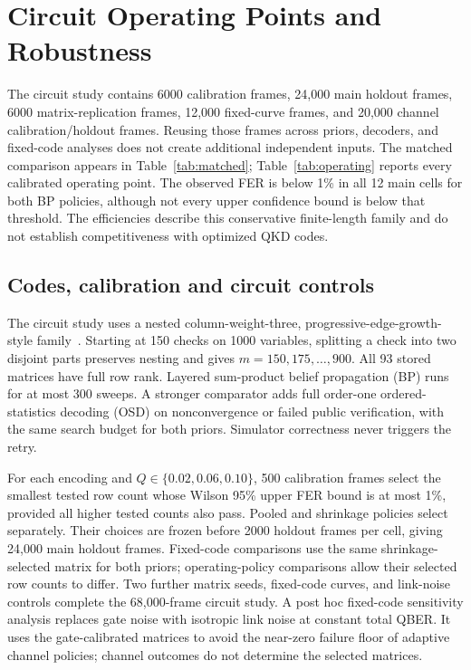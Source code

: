 \section{Circuit Operating Points and Robustness}
\label{app:circuit}
\label{app:ablation}
The circuit study contains 6000 calibration frames, 24,000 main holdout frames,
6000 matrix-replication frames, 12,000 fixed-curve frames, and 20,000 channel
calibration/holdout frames. Reusing those frames across priors, decoders, and fixed-code
analyses does not create additional independent inputs. The matched comparison appears in Table~\ref{tab:matched};
Table~\ref{tab:operating} reports every calibrated operating point. The observed FER is below 1\% in all
12 main cells for both BP policies, although not every upper confidence bound is
below that threshold. The efficiencies describe this conservative finite-length
family and do not establish competitiveness with optimized QKD codes.

\subsection{Codes, calibration and circuit controls}
The circuit study uses a nested column-weight-three, progressive-edge-growth-style
family~\cite{hu2005}. Starting at 150 checks on 1000 variables, splitting a check into
two disjoint parts preserves nesting and gives $m=150,175,\ldots,900$. All 93 stored
matrices have full row rank. Layered sum-product belief propagation (BP) runs for at most 300 sweeps.
A stronger comparator adds full order-one ordered-statistics decoding (OSD)
\cite{fossorier1995} on nonconvergence or failed public verification, with the same search
budget for both priors. Simulator correctness never triggers the retry.

For each encoding and $Q\in\{0.02,0.06,0.10\}$, 500 calibration frames select the
smallest tested row count whose Wilson 95\% upper FER bound is at most 1\%, provided
all higher tested counts also pass. Pooled and shrinkage policies select separately.
Their choices are frozen before 2000 holdout frames per cell, giving 24,000 main
holdout frames. Fixed-code comparisons use the same shrinkage-selected matrix for
both priors; operating-policy comparisons allow their selected row counts to differ.
Two further matrix seeds, fixed-code curves, and link-noise controls complete the
68,000-frame circuit study.
A post hoc fixed-code sensitivity analysis replaces gate noise with isotropic link
noise at constant total QBER. It uses the gate-calibrated matrices to avoid the
near-zero failure floor of adaptive channel policies; channel outcomes do not
determine the selected matrices.


